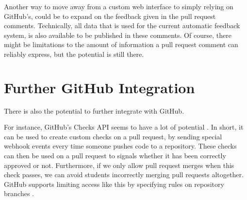 Another way to move away from a custom web interface to simply relying on GitHub's, could be to expand on the feedback given in the pull request comments.
Technically, all data that is used for the current automatic feedback system, is also available to be published in these comments.
Of course, there might be limitations to the amount of information a pull request comment can reliably express, but the potential is still there.

\section{Further GitHub Integration}

There is also the potential to further integrate with GitHub.

For instance, GitHub's Checks API seems to have a lot of potential \cite{checks}.
In short, it can be used to create custom checks on a pull request, by sending special webhook events every time someone pushes code to a repository.
These checks can then be used on a pull request to signals whether it has been correctly approved or not.
Furthermore, if we only allow pull request merges when this check passes, we can avoid students incorrectly merging pull requests altogether.
GitHub supports limiting access like this by specifying rules on repository branches \cite{branches}.
